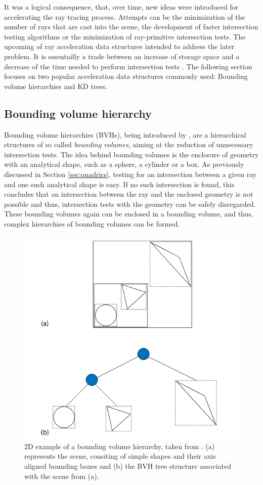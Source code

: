 
It was a logical consequence, that, over time, new ideas were introduced for accelerating the ray tracing process. Attempts can be the minimization of the number of rays that are cast into the scene, the development of faster intersection testing algorithms or the minimization of ray-primitive intersection tests. The upcoming of ray acceleration data structures intended to address the later problem. It is essentailly a trade between an increase of storage space and a decrease of the time needed to perform intersection tests . The following section focuses on two popular acceleration data structures commonly used: Bounding volume hierarchies and KD trees.

\subsection{Bounding volume hierarchy}

Bounding volume hierarchies (BVHs), being introduced by \cite{rubin19803}, are a hierarchical structures of so called \emph{bounding volumes}, aiming at the reduction of unnecessary intersection tests. The idea behind bounding volumes is the enclosure of geometry with an analytical shape, such as a sphere, a cylinder or a box. As previously discussed in Section \ref{sec:quadrics}, testing for an intersection between a given ray and one such analytical shape is easy. If no such intersection is found, this concludes that an intersection between the ray and the enclosed geometry is not possible and thus, intersection tests with the geometry can be safely disregarded. These bounding volumes again can be enclosed in a bounding volume, and thus, complex hierarchies of bounding volumes can be formed.

\begin{figure}
	\centering
	\includegraphics[width=.7\linewidth]{img/1 fundamentals/bvh.png}
	\caption{2D example of a bounding volume hierarchy, taken from \cite{pharr2016physically}. (a) represents the scene, consiting of simple shapes and their axis aligned bounding boxes and (b) the BVH tree structure associated with the scene from (a).}
	\label{fig:bvh}
\end{figure}

